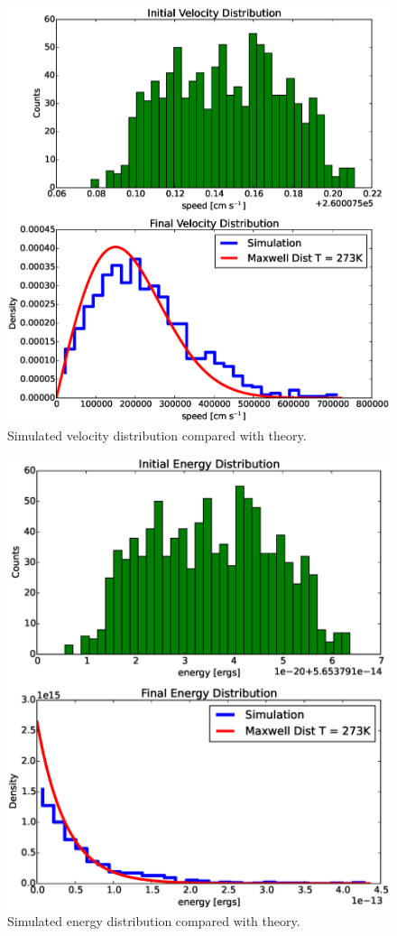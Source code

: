 \documentclass[12pt]{amsart}
\begin{document}
\begin{figure}[h!]
  \centering
    \includegraphics[width=1.0\textwidth]{vel_dist.eps}
    \caption{Simulated velocity distribution compared with theory.}
\end{figure}

\begin{figure}[h!]
  \centering
    \includegraphics[width=1.0\textwidth]{energy_dist.eps}
    \caption{Simulated energy distribution compared with theory.}
\end{figure}
\end{document}
